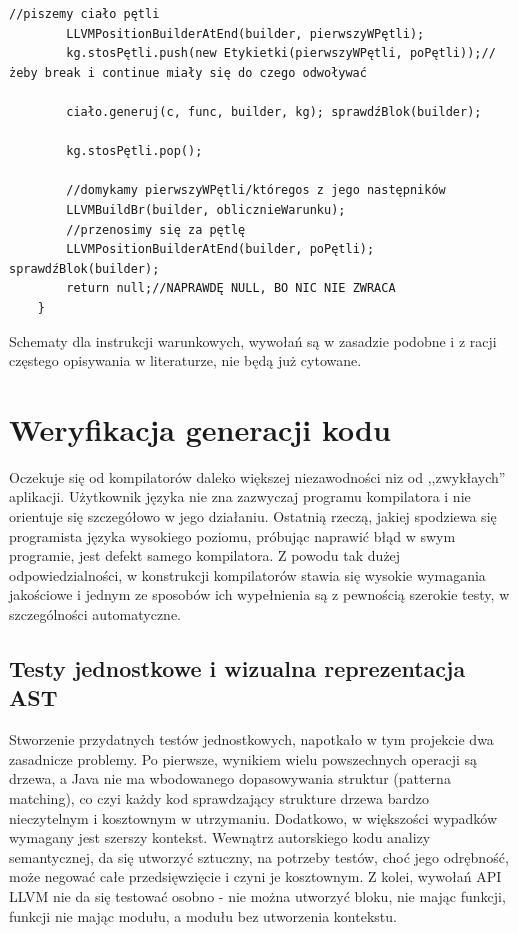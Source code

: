 \begin{lstlisting}[basicstyle=\scriptsize]
        //piszemy ciało pętli
        LLVMPositionBuilderAtEnd(builder, pierwszyWPętli);
        kg.stosPętli.push(new Etykietki(pierwszyWPętli, poPętli));//żeby break i continue miały się do czego odwoływać

        ciało.generuj(c, func, builder, kg); sprawdźBlok(builder);

        kg.stosPętli.pop();

        //domykamy pierwszyWPętli/któregos z jego następników
        LLVMBuildBr(builder, oblicznieWarunku);
        //przenosimy się za pętlę
        LLVMPositionBuilderAtEnd(builder, poPętli); sprawdźBlok(builder);
        return null;//NAPRAWDĘ NULL, BO NIC NIE ZWRACA
    }
\end{lstlisting}

Schematy dla instrukcji warunkowych, wywołań są w zasadzie podobne i z racji częstego opisywania w literaturze, nie będą już cytowane.


\section{Weryfikacja generacji kodu}
Oczekuje się od kompilatorów daleko większej niezawodności niz od ,,zwykłaych'' aplikacji\cite{waite_goos}. Użytkownik języka nie zna zazwyczaj programu kompilatora i nie orientuje się szczegółowo w jego działaniu. Ostatnią rzeczą, jakiej spodziewa się programista języka wysokiego poziomu, próbując naprawić błąd w swym programie, jest defekt samego kompilatora. Z powodu tak dużej odpowiedzialności, w konstrukcji kompilatorów stawia się wysokie wymagania jakościowe i jednym ze sposobów ich wypełnienia są z pewnością szerokie testy, w szczególności automatyczne.

\subsection{Testy jednostkowe i wizualna reprezentacja AST}
Stworzenie przydatnych testów jednostkowych, napotkało w tym projekcie dwa zasadnicze problemy. Po pierwsze, wynikiem wielu powszechnych operacji są drzewa, a Java nie ma wbodowanego dopasowywania struktur (patterna matching), co czyi każdy kod sprawdzający strukture drzewa bardzo nieczytelnym i kosztownym w utrzymaniu. Dodatkowo, w większości wypadków wymagany jest szerszy kontekst. Wewnątrz autorskiego kodu analizy semantycznej, da się utworzyć sztuczny, na potrzeby testów, choć jego odrębność, może negować całe przedsięwzięcie i czyni je kosztownym. Z kolei, wywołań API LLVM nie da się testować osobno - nie można utworzyć bloku, nie mając funkcji, funkcji nie mając modułu, a modułu bez utworzenia kontekstu.

